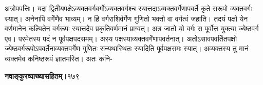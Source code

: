 \documentclass[11pt, openany]{book}
\begin{document}
\begin{sloppypar}
\hangindent=0.2in \hspace{0.2in}अत्रोपपत्तिः। यदा द्वितीयपक्षेऽव्यक्तवर्गवर्गोऽव्यक्तवर्गश्च स्यात्तदाऽव्यक्तवर्गेणापवर्ते कृते सरूपो व्यक्तवर्गः स्यात्। अनेनापि वर्गेणैव भाव्यम्। न हि वर्गराशिर्वर्गेण गुणितो भक्तो वा वर्गत्वं जहाति। तदयं पक्षो येन वर्णमानेन कल्पितेन वर्गरूपः स्यात्तदेव प्रकृतिवर्णमानं प्राग्वत्। अत्र जातो यो वर्गः स पूर्वोत्त युक्त्या ज्येष्ठवर्ग एव। परमेतस्य पदं न पूर्वपक्षपदसमम्। अस्य पक्षस्याव्यक्तवर्गेणापवर्तनात्। अतोऽसावपवर्तितपक्षो ज्येष्ठवर्गरूपोऽपवर्तेनाव्यक्तवर्गेण गुणितः सन्यथास्थितः स्यादिति पूर्वपक्षसमः स्यात्। अव्यक्तस्य तु मानं व्यक्तमेव कनिष्ठरूपं ज्ञातमस्ति। अतः कनि-
\end{sloppypar}
\thispagestyle{empty}
\newpage

\onehalfspacing
\hspace{2in}\textbf{नवाङ्कुरव्याख्यासहितम्।}\hspace{2in}१७९

\vspace{5mm}
\end{document}
